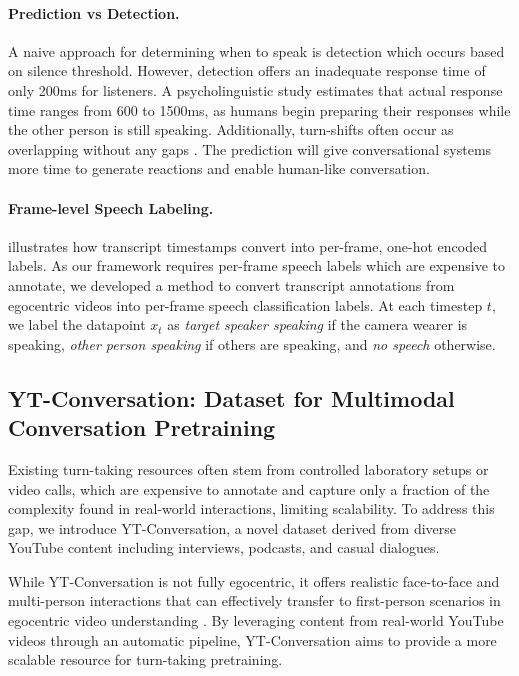 \paragraph{Prediction vs Detection.}
A naive approach for determining when to speak is detection which occurs based on silence threshold. However, detection offers an inadequate response time of only 200ms for listeners. A psycholinguistic study \cite{levinson2015timing} estimates that actual response time ranges from 600 to 1500ms, as humans begin preparing their responses while the other person is still speaking. Additionally, turn-shifts often occur as overlapping without any gaps \cite{skantze2021turnreview}. The prediction will give conversational systems more time to generate reactions and enable human-like conversation.



\paragraph{Frame-level Speech Labeling.}

 illustrates how transcript timestamps convert into 
per-frame, one-hot encoded labels. As our framework requires per-frame speech labels which are expensive to annotate, we developed a method to convert transcript annotations from egocentric videos into per-frame speech classification labels. At each timestep $t$, we label the datapoint $x_t$ as \textit{target speaker speaking} if the camera wearer is speaking, \textit{other person speaking} if others are speaking, and \textit{no speech} otherwise.

\subsection{YT-Conversation: Dataset for Multimodal Conversation Pretraining}
Existing turn-taking resources often stem from controlled laboratory setups or video calls, which are expensive to annotate and capture only a fraction of the complexity found in real-world interactions, limiting scalability. To address this gap, we introduce YT-Conversation, a novel dataset derived from diverse YouTube content including interviews, podcasts, and casual dialogues.

While YT-Conversation is not fully egocentric, it offers realistic face-to-face and multi-person interactions that can effectively transfer to first-person scenarios in egocentric video understanding \cite{zhang2022actionformer, lin2022egocentric}. By leveraging content from real-world YouTube videos through an automatic pipeline, YT-Conversation aims to provide a more scalable resource for turn-taking pretraining.



